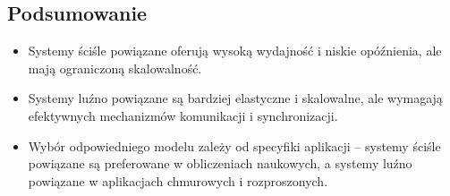 \subsection{Podsumowanie}
\begin{itemize}
    \item Systemy ściśle powiązane oferują wysoką wydajność i niskie opóźnienia, ale mają ograniczoną skalowalność.
    \item Systemy luźno powiązane są bardziej elastyczne i skalowalne, ale wymagają efektywnych mechanizmów komunikacji i synchronizacji.
    \item Wybór odpowiedniego modelu zależy od specyfiki aplikacji – systemy ściśle powiązane są preferowane w obliczeniach naukowych, a systemy luźno powiązane w aplikacjach chmurowych i rozproszonych.
\end{itemize}
